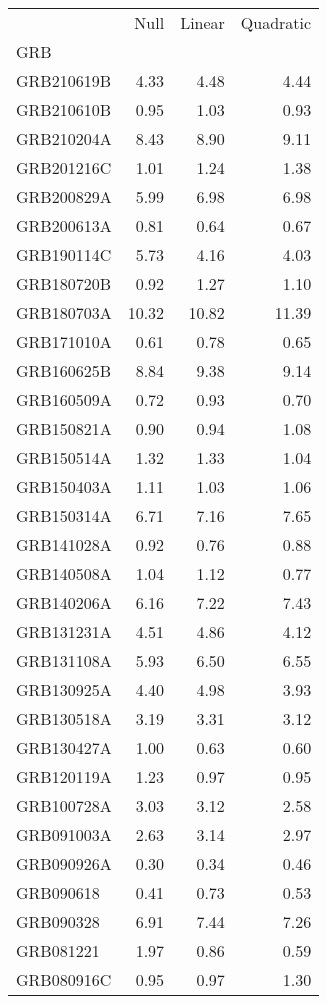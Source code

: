 \begin{tabular}{lrrr}
\toprule
 & Null & Linear & Quadratic \\
GRB &  &  &  \\
\midrule
GRB210619B & 4.33 & 4.48 & 4.44 \\
GRB210610B & 0.95 & 1.03 & 0.93 \\
GRB210204A & 8.43 & 8.90 & 9.11 \\
GRB201216C & 1.01 & 1.24 & 1.38 \\
GRB200829A & 5.99 & 6.98 & 6.98 \\
GRB200613A & 0.81 & 0.64 & 0.67 \\
GRB190114C & 5.73 & 4.16 & 4.03 \\
GRB180720B & 0.92 & 1.27 & 1.10 \\
GRB180703A & 10.32 & 10.82 & 11.39 \\
GRB171010A & 0.61 & 0.78 & 0.65 \\
GRB160625B & 8.84 & 9.38 & 9.14 \\
GRB160509A & 0.72 & 0.93 & 0.70 \\
GRB150821A & 0.90 & 0.94 & 1.08 \\
GRB150514A & 1.32 & 1.33 & 1.04 \\
GRB150403A & 1.11 & 1.03 & 1.06 \\
GRB150314A & 6.71 & 7.16 & 7.65 \\
GRB141028A & 0.92 & 0.76 & 0.88 \\
GRB140508A & 1.04 & 1.12 & 0.77 \\
GRB140206A & 6.16 & 7.22 & 7.43 \\
GRB131231A & 4.51 & 4.86 & 4.12 \\
GRB131108A & 5.93 & 6.50 & 6.55 \\
GRB130925A & 4.40 & 4.98 & 3.93 \\
GRB130518A & 3.19 & 3.31 & 3.12 \\
GRB130427A & 1.00 & 0.63 & 0.60 \\
GRB120119A & 1.23 & 0.97 & 0.95 \\
GRB100728A & 3.03 & 3.12 & 2.58 \\
GRB091003A & 2.63 & 3.14 & 2.97 \\
GRB090926A & 0.30 & 0.34 & 0.46 \\
GRB090618 & 0.41 & 0.73 & 0.53 \\
GRB090328 & 6.91 & 7.44 & 7.26 \\
GRB081221 & 1.97 & 0.86 & 0.59 \\
GRB080916C & 0.95 & 0.97 & 1.30 \\
\bottomrule
\end{tabular}
